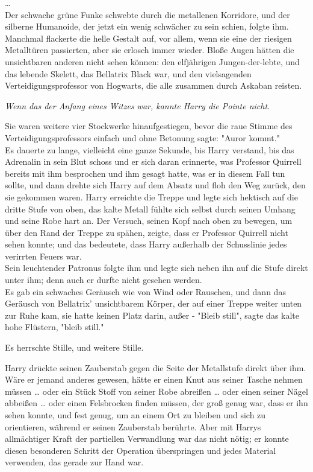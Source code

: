 {…\\ Der schwache grüne Funke schwebte durch die metallenen Korridore, und der silberne Humanoide, der jetzt ein wenig schwächer zu sein schien, folgte ihm.\\ Manchmal flackerte die helle Gestalt auf, vor allem, wenn sie eine der riesigen Metalltüren passierten, aber sie erlosch immer wieder. Bloße Augen hätten die unsichtbaren anderen nicht sehen können: den elfjährigen Jungen-der-lebte, und das lebende Skelett, das Bellatrix Black war, und den vielsagenden Verteidigungsprofessor von Hogwarts, die alle zusammen durch Askaban reisten.

\emph{Wenn das der Anfang eines Witzes war, kannte Harry die Pointe nicht.}

Sie waren weitere vier Stockwerke hinaufgestiegen, bevor die raue Stimme des Verteidigungsprofessors einfach und ohne Betonung sagte: "Auror kommt."\\ Es dauerte zu lange, vielleicht eine ganze Sekunde, bis Harry verstand, bis das Adrenalin in sein Blut schoss und er sich daran erinnerte, was Professor Quirrell bereits mit ihm besprochen und ihm gesagt hatte, was er in diesem Fall tun sollte, und dann drehte sich Harry auf dem Absatz und floh den Weg zurück, den sie gekommen waren. Harry erreichte die Treppe und legte sich hektisch auf die dritte Stufe von oben, das kalte Metall fühlte sich selbst durch seinen Umhang und seine Robe hart an. Der Versuch, seinen Kopf nach oben zu bewegen, um über den Rand der Treppe zu spähen, zeigte, dass er Professor Quirrell nicht sehen konnte; und das bedeutete, dass Harry außerhalb der Schusslinie jedes verirrten Feuers war.\\ Sein leuchtender Patronus folgte ihm und legte sich neben ihn auf die Stufe direkt unter ihm; denn auch er durfte nicht gesehen werden.\\ Es gab ein schwaches Geräusch wie von Wind oder Rauschen, und dann das Geräusch von Bellatrix' unsichtbarem Körper, der auf einer Treppe weiter unten zur Ruhe kam, sie hatte keinen Platz darin, außer - "Bleib still", sagte das kalte hohe Flüstern, "bleib still."

Es herrschte Stille, und weitere Stille.

Harry drückte seinen Zauberstab gegen die Seite der Metallstufe direkt über ihm. Wäre er jemand anderes gewesen, hätte er einen Knut aus seiner Tasche nehmen müssen … oder ein Stück Stoff von seiner Robe abreißen … oder einen seiner Nägel abbeißen … oder einen Felsbrocken finden müssen, der groß genug war, dass er ihn sehen konnte, und fest genug, um an einem Ort zu bleiben und sich zu orientieren, während er seinen Zauberstab berührte. Aber mit Harrys allmächtiger Kraft der partiellen Verwandlung war das nicht nötig; er konnte diesen besonderen Schritt der Operation überspringen und jedes Material verwenden, das gerade zur Hand war.

}
